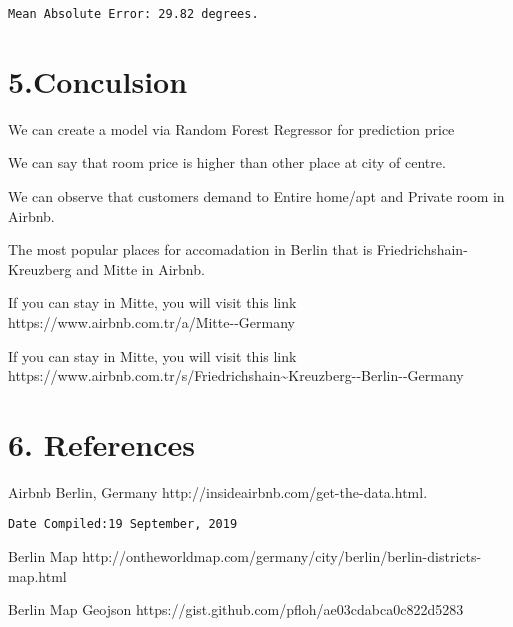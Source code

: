 \documentclass[11pt]{article}
\begin{document}
    \begin{Verbatim}[commandchars=\\\{\}]
Mean Absolute Error: 29.82 degrees.

    \end{Verbatim}

    \section{5.Conculsion}\label{conculsion}

We can create a model via Random Forest Regressor for prediction price

We can say that room price is higher than other place at city of centre.

We can observe that customers demand to Entire home/apt and Private room
in Airbnb.

The most popular places for accomadation in Berlin that is
Friedrichshain-Kreuzberg and Mitte in Airbnb.

If you can stay in Mitte, you will visit this link
https://www.airbnb.com.tr/a/Mitte-\/-Germany

If you can stay in Mitte, you will visit this link
https://www.airbnb.com.tr/s/Friedrichshain\textasciitilde{}Kreuzberg-\/-Berlin-\/-Germany

    \section{6. References}\label{references}

Airbnb Berlin, Germany http://insideairbnb.com/get-the-data.html.

\begin{verbatim}
Date Compiled:19 September, 2019
\end{verbatim}

Berlin Map
http://ontheworldmap.com/germany/city/berlin/berlin-districts-map.html

Berlin Map Geojson https://gist.github.com/pfloh/ae03cdabca0c822d5283


    
    
    
    
\end{document}
